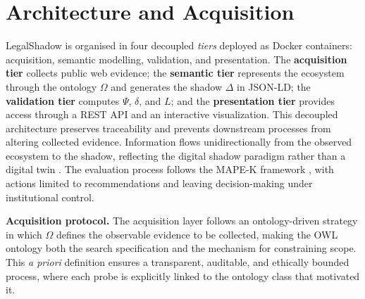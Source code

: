 \documentclass[engproc,proceedingpaper,submit,moreauthors]{Definitions/mdpi}
\begin{document}
\section{Architecture and Acquisition}
\label{sec:arch}
    LegalShadow is organised in four decoupled \emph{tiers} deployed as Docker containers: acquisition, semantic modelling, validation, and presentation. The 
    \textbf{acquisition tier} collects public web evidence; the 
    \textbf{semantic tier} represents the ecosystem through the ontology $\Omega$ and generates the shadow $\Delta$ in JSON-LD; the 
    \textbf{validation tier} computes $\Psi$, $\delta$, and $L$; and the \textbf{presentation tier} provides access through a REST API and an interactive visualization. This decoupled architecture preserves traceability and prevents downstream processes from altering collected evidence. Information flows unidirectionally from the observed ecosystem to the shadow, reflecting the digital shadow paradigm rather than a digital twin \cite{Kritzinger2018,Sepasgozar2021}. The evaluation process follows the MAPE-K framework \cite{Kephart2003}, with actions limited to recommendations and leaving decision-making under institutional control.

\textbf{Acquisition protocol.} 
    The acquisition layer follows an ontology-driven strategy in which $\Omega$ defines the observable evidence to be collected, making the OWL ontology both the search specification and the mechanism for constraining scope. This \emph{a priori} definition ensures a transparent, auditable, and ethically bounded process, where each probe is explicitly linked to the ontology class that motivated it.
\end{document}
